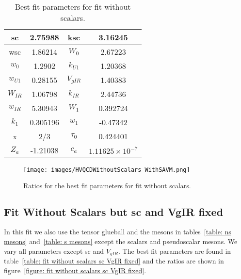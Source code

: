 \documentclass[10 pt]{article}
\begin{document}
\begin{table}
\centering
\begin{tabular}{ | c | c | c | c |}
\hline
sc & 2.75988 & ksc & 3.16245 \\
\hline
wsc &1.86214 & $W_0$ & 2.67223 \\
\hline
$w_0$ & 1.2902 & $k_{U1}$ & 1.20368 \\
\hline
$w_{U1}$ & 0.28155 & $V_{gIR}$ & 1.40383 \\
\hline
$W_{IR}$ & 1.06798 & $k_{IR}$ & 2.44736 \\
\hline
$w_{IR}$ & 5.30943 & $W_1$ & 0.392724 \\
\hline
$k_1$ & 0.305196 & $w_1$ & -0.47342 \\
\hline
x & 2/3 & $\tau_0$ & 0.424401\\
\hline
$Z_a$ & -1.21038 & $c_a$ & $1.11625 \times 10^{-7}$ \\
\hline
\end{tabular}
\caption{Best fit parameters for fit without scalars.}
\label{table: fit without scalars parameters} 
\end{table}

\begin{figure}
  \center
  \texttt{[image: images/HVQCDWithoutScalars\_WithSAVM.png]} 
  \caption{Ratios for the best fit parameters for fit without scalars.}
  \label{figure: fit without scalars}
\end{figure}


\subsection{Fit Without Scalars but sc and VgIR fixed}

In this fit we also use the tensor glueball and the mesons in tables~\ref{table: ns mesons} and~\ref{table: s mesons} except the scalars and pseudoscalar mesons. We vary all parameters except sc and $V_{gIR}$. The best fit parameters are found in table~\ref{table: fit without scalars sc VgIR fixed} and the ratios are shown in figure~\ref{figure: fit without scalars sc VgIR fixed}.
\end{document}
